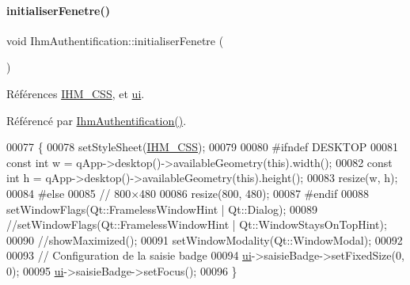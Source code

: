 \paragraph{\texorpdfstring{initialiser\+Fenetre()}{initialiserFenetre()}}
{\footnotesize\ttfamily void Ihm\+Authentification\+::initialiser\+Fenetre (\begin{DoxyParamCaption}{ }\end{DoxyParamCaption})\hspace{0.3cm}{\ttfamily [private]}}



Références \hyperlink{e-stock_8h_a7185157bd11830373a0f95d0dc88b2c3}{I\+H\+M\+\_\+\+C\+SS}, et \hyperlink{class_ihm_authentification_a2bab782e7f65474f2817c3916ded9d18}{ui}.



Référencé par \hyperlink{class_ihm_authentification_a09e60cbdf8d1377e17d940463acb75ba}{Ihm\+Authentification()}.


\begin{DoxyCode}
00077 \{
00078     setStyleSheet(\hyperlink{e-stock_8h_a7185157bd11830373a0f95d0dc88b2c3}{IHM\_CSS});
00079 
00080 \textcolor{preprocessor}{    #ifndef DESKTOP}
00081     \textcolor{keyword}{const} \textcolor{keywordtype}{int} w = qApp->desktop()->availableGeometry(\textcolor{keyword}{this}).width();
00082     \textcolor{keyword}{const} \textcolor{keywordtype}{int} h = qApp->desktop()->availableGeometry(\textcolor{keyword}{this}).height();
00083     resize(w, h);
00084 \textcolor{preprocessor}{    #else}
00085     \textcolor{comment}{// 800×480}
00086     resize(800, 480);
00087 \textcolor{preprocessor}{    #endif}
00088     setWindowFlags(Qt::FramelessWindowHint | Qt::Dialog);
00089     \textcolor{comment}{//setWindowFlags(Qt::FramelessWindowHint | Qt::WindowStaysOnTopHint);}
00090     \textcolor{comment}{//showMaximized();}
00091     setWindowModality(Qt::WindowModal);
00092 
00093     \textcolor{comment}{// Configuration de la saisie badge}
00094     \hyperlink{class_ihm_authentification_a2bab782e7f65474f2817c3916ded9d18}{ui}->saisieBadge->setFixedSize(0, 0);
00095     \hyperlink{class_ihm_authentification_a2bab782e7f65474f2817c3916ded9d18}{ui}->saisieBadge->setFocus();
00096 \}
\end{DoxyCode}
\mbox{\label{class_ihm_authentification_a6a67fe1c8e354a9ad123d8c53c16c6c4}} 
